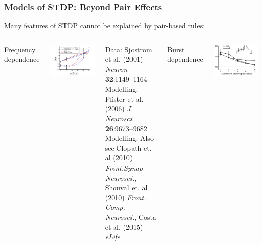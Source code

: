 \documentclass{beamer}
\begin{document}
\begin{frame}
\frametitle{Models of STDP: Beyond Pair Effects}
Many features of STDP cannot be explained by pair-based rules:
\begin{columns}[T]
\begin{center}
    Frequency dependence
\end{center}
    \includegraphics[width=\textwidth]{./figures/triplet-frequency}

    \tiny{Data: Sjostrom et al. (2001) \textit{Neuron} \textbf{32}:1149--1164}\\
    \tiny{Modelling: Pfister et al. (2006) \textit{J Neurosci} \textbf{26}:9673--9682}
    \tiny{Modelling: Also see Clopath et. al (2010) \textit{Front.Synap Neurosci.}, Shouval et. al (2010) \textit{Front. Comp. Neurosci.}, Costa et al. (2015) \textit{eLife} }
\begin{center}Burst dependence\end{center}
    \includegraphics[width=\textwidth]{./figures/froemke_burst}  


\end{columns}
\end{frame}
\end{document}
